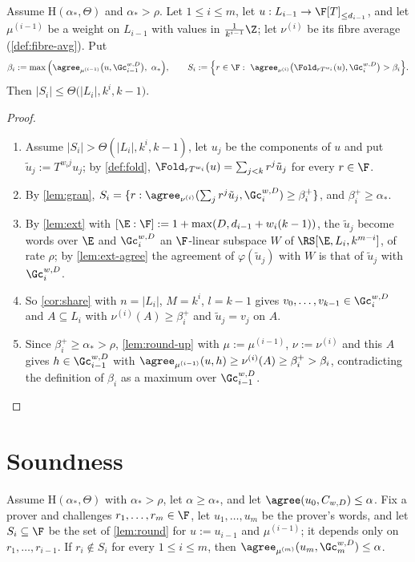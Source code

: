 {{\begin{lemma}\label{lem:round}
Assume $\mathrm H(\alpha_*,\Theta)$ and $\alpha_*>\rho$. Let $1\le i\le m$, let $u:L_{i-1}\to\F[T]_{\le d_{i-1}}$,
and let $\mu^{(i-1)}$ be a weight on $L_{i-1}$ with values in $\frac1{k^{i-1}}\Z$; let
$\nu^{(i)}$ be its fibre average (\ref{def:fibre-avg}). Put
\[
\beta_i:=\max\Big(\agree_{\mu^{(i-1)}}\big(u,\Gc_{i-1}^{w,D}\big),\ \alpha_*\Big),\qquad
S_i:=\Big\{r\in\F:\ \agree_{\nu^{(i)}}\big(\Fold_{rT^{w_i}}(u),\Gc_i^{w,D}\big)>\beta_i\Big\}.
\]
Then $|S_i|\le\Theta\big(|L_i|,k^i,k-1\big)$.
\end{lemma}

\begin{proof}\begin{enumerate}
\item Assume $|S_i|>\Theta(|L_i|,k^i,k-1)$, let $u_j$ be the components of $u$ and put $\tilde u_j:=T^{w_ij}u_j$; by \ref{def:fold}, $\Fold_{rT^{w_i}}(u)=\sum_{j<k}r^j\tilde u_j$ for every $r\in\F$.
\item By \ref{lem:gran}, $S_i=\{r:\agree_{\nu^{(i)}}(\sum_jr^j\tilde u_j,\Gc_i^{w,D})\ge\beta_i^+\}$, and $\beta_i^+\ge\alpha_*$.
\item By \ref{lem:ext} with $[\E:\F]:=1+\max(D,d_{i-1}+w_i(k-1))$, the $\tilde u_j$ become words over $\E$ and $\Gc_i^{w,D}$ an $\F$-linear subspace $W$ of $\RS[\E,L_i,k^{m-i}]$, of rate $\rho$; by \ref{lem:ext-agree} the agreement of $\varphi(\tilde u_j)$ with $W$ is that of $\tilde u_j$ with $\Gc_i^{w,D}$.
\item So \ref{cor:share} with $n=|L_i|$, $M=k^i$, $l=k-1$ gives $v_0,\dots,v_{k-1}\in\Gc_i^{w,D}$ and $A\subseteq L_i$ with $\nu^{(i)}(A)\ge\beta_i^+$ and $\tilde u_j=v_j$ on $A$.
\item Since $\beta_i^+\ge\alpha_*>\rho$, \ref{lem:round-up} with $\mu:=\mu^{(i-1)}$, $\nu:=\nu^{(i)}$ and this $A$ gives $h\in\Gc_{i-1}^{w,D}$ with $\agree_{\mu^{(i-1)}}(u,h)\ge\nu^{(i)}(A)\ge\beta_i^+>\beta_i$, contradicting the definition of $\beta_i$ as a maximum over $\Gc_{i-1}^{w,D}$.
\end{enumerate}\end{proof}

\section{Soundness}

\begin{lemma}\label{lem:sound-fold}
Assume $\mathrm H(\alpha_*,\Theta)$ with $\alpha_*>\rho$, let $\alpha\ge\alpha_*$, and let
$\agree(u_0,C_{w,D})\le\alpha$. Fix a prover and challenges $r_1,\dots,r_m\in\F$, let
$u_1,\dots,u_m$ be the prover's words, and let $S_i\subseteq\F$ be the set of \ref{lem:round}
for $u:=u_{i-1}$ and $\mu^{(i-1)}$; it depends only on $r_1,\dots,r_{i-1}$. If $r_i\notin S_i$
for every $1\le i\le m$, then $\agree_{\mu^{(m)}}(u_m,\Gc_m^{w,D})\le\alpha$.
\end{lemma}

}}

